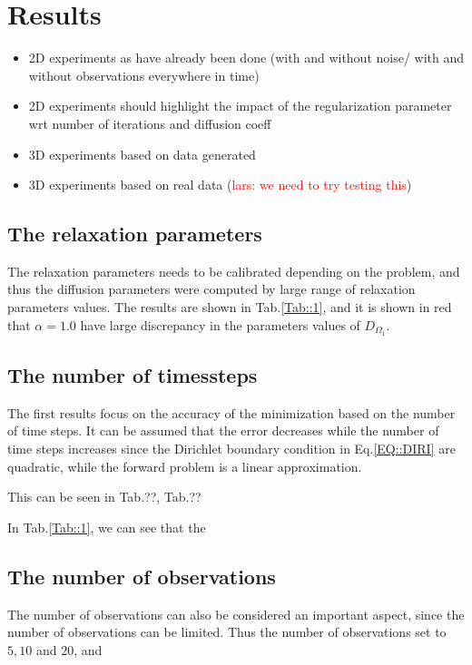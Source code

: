 \documentclass[11pt,a4paper]{article}
\renewcommand{\comment}[1]{\textcolor{red}{#1}}
\begin{document}
\section{Results}
\begin{itemize}
\item 2D experiments as have already been done (with and without noise/ with and without observations everywhere in time) 
\item 2D experiments should highlight the impact of the regularization parameter wrt number of iterations and diffusion 
coeff 
\item 3D experiments based on data generated  
\item 3D experiments based on real data (\comment{lars: we need to try testing this}) 
\end{itemize}

\subsection{The relaxation parameters}
The relaxation parameters needs to be calibrated depending on the problem, and thus the diffusion parameters were computed by large range of relaxation parameters values. The results are shown in Tab.\ref{Tab::1}, and it is shown in red that $\alpha=1.0$ have large discrepancy in the parameters values of $D_{\Omega_1}$. 


\subsection{The number of timessteps}
The first results focus on the accuracy of the minimization based on the number of time steps. It can be assumed that the error decreases  while the number of time steps increases since the Dirichlet boundary condition in Eq.\ref{EQ::DIRI} are quadratic, while the forward problem is a linear approximation. 

This can be seen in Tab.??, Tab.??





In Tab.\ref{Tab::1}, we can see that the 

\subsection{The number of observations}
The number of observations can also be considered an important aspect, since the number of observations can be limited. Thus the number of observations set to $5,10 $ and $20$, and  
\end{document}
